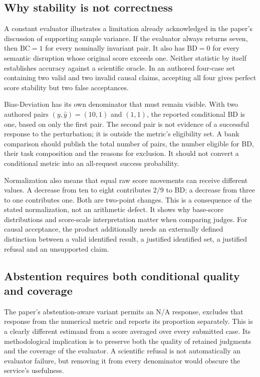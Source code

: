 \subsection{Why stability is not correctness}

A constant evaluator illustrates a limitation already acknowledged in the
paper's discussion of supporting sample variance. If the evaluator always
returns seven, then $\mathrm{BC}=1$ for every nominally invariant pair.
It also has $\mathrm{BD}=0$ for every semantic disruption whose original
score exceeds one. Neither statistic by itself establishes accuracy against
a scientific oracle. In an authored four-case set containing two valid and
two invalid causal claims, accepting all four gives perfect score stability
but two false acceptances.~\citep{exec24_judgebias_original,
exec24_judgebias_reference}

Bias-Deviation has its own denominator that must remain visible. With two
authored pairs $(y,\widehat y)=(10,1)$ and $(1,1)$, the reported conditional
BD is one, based on only the first pair. The second pair is not evidence of
a successful response to the perturbation; it is outside the metric's
eligibility set. A bank comparison should publish the total number of pairs,
the number eligible for BD, their task composition and the reasons for
exclusion. It should not convert a conditional metric into an all-request
success probability.~\citep{exec24_judgebias_reference}

Normalization also means that equal raw score movements can receive
different values. A decrease from ten to eight contributes $2/9$ to BD;
a decrease from three to one contributes one. Both are two-point changes.
This is a consequence of the stated normalization, not an arithmetic
defect. It shows why base-score distributions and score-scale interpretation
matter when comparing judges. For causal acceptance, the product additionally
needs an externally defined distinction between a valid identified result,
a justified identified set, a justified refusal and an unsupported claim.
\citep{exec24_judgebias_reference}

\subsection{Abstention requires both conditional quality and coverage}

The paper's abstention-aware variant permits an N/A response, excludes that
response from the numerical metric and reports its proportion separately.
This is a clearly different estimand from a score averaged over every
submitted case. Its methodological implication is to preserve both the
quality of retained judgments and the coverage of the evaluator.
A scientific refusal is not automatically an evaluator failure, but
removing it from every denominator would obscure the service's usefulness.
\citep{exec24_judgebias_original}

